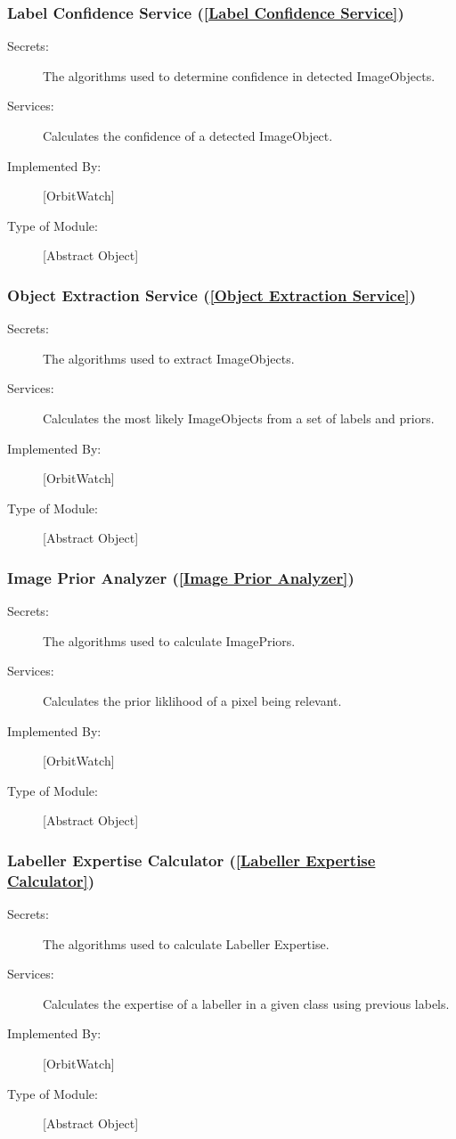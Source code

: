 \documentclass[12pt, titlepage]{article}
\begin{document}
\subsubsection{Label Confidence Service (\ref{Label Confidence Service})}
\begin{description}
\item[Secrets:] The algorithms used to determine confidence in detected ImageObjects.
\item[Services:] Calculates the confidence of a detected ImageObject.
\item[Implemented By:] [OrbitWatch]
\item[Type of Module:] [Abstract Object]
\end{description}

\subsubsection{Object Extraction Service (\ref{Object Extraction Service})}
\begin{description}
\item[Secrets:] The algorithms used to extract ImageObjects.
\item[Services:] Calculates the most likely ImageObjects from a set of labels and priors.
\item[Implemented By:] [OrbitWatch]
\item[Type of Module:] [Abstract Object]
\end{description}

\subsubsection{Image Prior Analyzer (\ref{Image Prior Analyzer})}
\begin{description}
\item[Secrets:] The algorithms used to calculate ImagePriors.
\item[Services:] Calculates the prior liklihood of a pixel being relevant.
\item[Implemented By:] [OrbitWatch]
\item[Type of Module:] [Abstract Object]
\end{description}

\subsubsection{Labeller Expertise Calculator (\ref{Labeller Expertise Calculator})}
\begin{description}
\item[Secrets:] The algorithms used to calculate Labeller Expertise.
\item[Services:] Calculates the expertise of a labeller in a given class using previous labels.
\item[Implemented By:] [OrbitWatch]
\item[Type of Module:] [Abstract Object]
\end{description}
\end{document}
